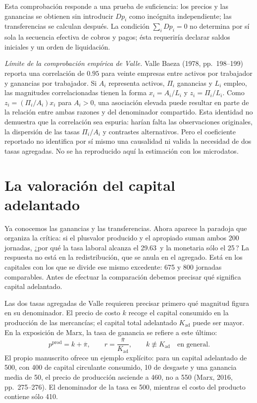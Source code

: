\documentclass[10pt,twoside]{article}
\newcommand{\pct}{\ifmmode\text{\char37}\else\char37\fi}
\begin{document}
Esta comprobación responde a una prueba de suficiencia: los precios y las ganancias se obtienen sin introducir $Dp_i$ como incógnita independiente; las transferencias se calculan después. La condición $\sum_i Dp_i=0$ no determina por sí sola la secuencia efectiva de cobros y pagos; ésta requeriría declarar saldos iniciales y un orden de liquidación. 

\noindent\textit{Límite de la comprobación empírica de Valle.} Valle Baeza (1978, pp.~198--199) reporta una correlación de $0.95$ para veinte empresas entre activos por trabajador y ganancias por trabajador. Si $A_i$ representa activos, $\Pi_i$ ganancias y $L_i$ empleo, las magnitudes correlacionadas tienen la forma $x_i=A_i/L_i$ y $z_i=\Pi_i/L_i$. Como $z_i=(\Pi_i/A_i)x_i$ para $A_i>0$, una asociación elevada puede resultar en parte de la relación entre ambas razones y del denominador compartido. Esta identidad no demuestra que la correlación sea espuria: harían falta las observaciones originales, la dispersión de las tasas $\Pi_i/A_i$ y contrastes alternativos. Pero el coeficiente reportado no identifica por sí mismo una causalidad ni valida la necesidad de dos tasas agregadas. No se ha reproducido aquí la estimación con los microdatos. 



\section{La valoración del capital adelantado}
Ya conocemos las ganancias y las transferencias. Ahora aparece la paradoja que organiza la crítica: si el plusvalor producido y el apropiado suman ambos 200 jornadas, ¿por qué la tasa laboral alcanza el 29.63\,\pct{} y la monetaria sólo el 25\,\pct{}? La respuesta no está en la redistribución, que se anula en el agregado. Está en los capitales con los que se divide ese mismo excedente: 675 y 800 jornadas comparables. Antes de efectuar la comparación debemos precisar qué significa capital adelantado.

Las dos tasas agregadas de Valle requieren precisar primero qué magnitud figura en su denominador. El precio de costo $k$ recoge el capital consumido en la producción de las mercancías; el capital total adelantado $K_{\mathrm{ad}}$ puede ser mayor. En la exposición de Marx, la tasa de ganancia se refiere a este último:
\begin{equation}
p^{\mathrm{prod}}=k+\overline\pi,\qquad
r=\frac{\overline\pi}{K_{\mathrm{ad}}},\qquad
k\not\equiv K_{\mathrm{ad}}\quad\text{en general}.\label{eq:costK}
\end{equation}
El propio manuscrito ofrece un ejemplo explícito: para un capital adelantado de 500, con 400 de capital circulante consumido, 10 de desgaste y una ganancia media de 50, el precio de producción asciende a 460, no a 550 (Marx, 2016, pp.~275--276). El denominador de la tasa es 500, mientras el costo del producto contiene sólo 410.
\end{document}
